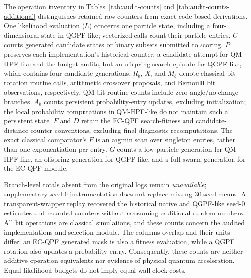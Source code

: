 The operation inventory in Tables~\ref{tab:audit-counts} and
\ref{tab:audit-counts-additional} distinguishes retained raw counters from
exact code-based derivations. One likelihood evaluation ($L$) concerns one
particle state, including a four-dimensional state in QGPF-like; vectorized
calls count their particle entries. $C$ counts generated candidate states or
binary subsets submitted to scoring. $P$ preserves each implementation's
historical counter: a candidate attempt for QM-HPF-like and the budget audits,
but an offspring search episode for QGPF-like, which contains four candidate
generations. $R_b$, $X$, and $M_b$ denote classical bit rotation routine calls,
arithmetic crossover proposals, and Bernoulli bit observations, respectively.
QM bit routine counts include zero-angle/no-change branches. $A_b$ counts
persistent probability-entry updates, excluding initialization; the local
probability computations in QM-HPF-like do not maintain such a persistent
state. $F$ and $D$ retain the EC-QPF search-fitness and candidate-distance
counter conventions, excluding final diagnostic recomputations. The exact
classical comparator's $F$ is an argmin scan over singleton entries, rather
than one exponentiation per entry. $G$ counts a low-particle generation for
QM-HPF-like, an offspring generation for QGPF-like, and a full swarm generation
for the EC-QPF module.

Branch-level totals absent from the original logs remain
\textit{unavailable}; supplementary seed-0 instrumentation does not replace
missing 30-seed means. A transparent-wrapper replay recovered the historical
native and QGPF-like seed-0 estimates and recorded counters without consuming
additional random numbers. All bit operations are classical simulations, and
these counts concern the audited implementations and selection module. The
columns overlap and their units differ: an EC-QPF generated mask is also a
fitness evaluation, while a QGPF rotation also updates a probability entry.
Consequently, these counts are neither additive operation equivalents nor
evidence of physical quantum acceleration. Equal likelihood budgets do not
imply equal wall-clock costs.

